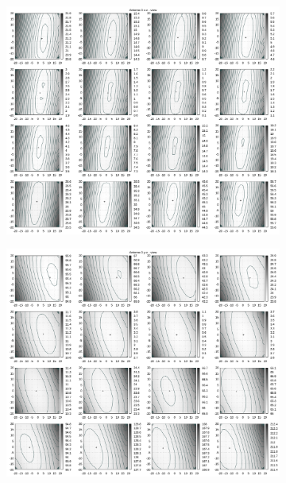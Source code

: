 \begin{appendix}
\begin{figure}[!ht]
\begin{subfigure}[t]{0.3\textwidth}
	\end{subfigure}
	\begin{subfigure}[t]{0.3\textwidth}
		\centering
	     \includegraphics[width=\textwidth]{img/fitness/xz/a3.png}
	\end{subfigure}
	\begin{subfigure}[t]{0.3\textwidth}
			\centering
	   \includegraphics[width=\textwidth]{img/fitness/yz/a3.png}

\end{subfigure}
\end{figure}
\end{appendix}
